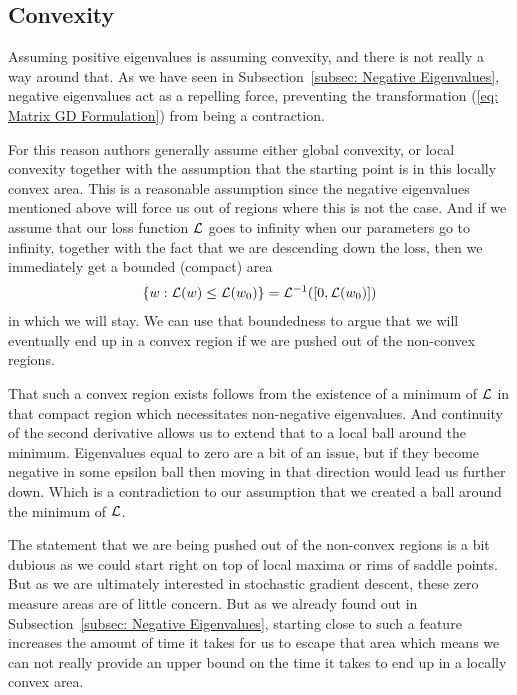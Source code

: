 \subsection{Convexity}

Assuming positive eigenvalues is assuming convexity, and there is not really a
way around that. As we have seen in Subsection~\ref{subsec: Negative
Eigenvalues}, negative eigenvalues act as a repelling force, preventing the
transformation (\ref{eq: Matrix GD Formulation}) from being a contraction.

For this reason authors generally assume either global convexity, or local
convexity together with the assumption that the starting point is in this
locally convex area. This is a reasonable assumption since the negative
eigenvalues mentioned above will force us out of regions where this is not
the case. And if we assume that our loss function \(\mathcal{L}\) goes to infinity when
our parameters go to infinity, together with the fact that we are descending
down the loss, then we immediately get a bounded (compact) area 
%
\begin{align*}
	\{w : \mathcal{L}(w) \le \mathcal{L}(w_0)\} = \mathcal{L}^{-1}([0, \mathcal{L}(w_0)])
\end{align*}
%
in which we will stay. We can use that boundedness to argue that we will
eventually end up in a convex region if we are pushed out of the non-convex
regions.

That such a convex region exists follows from the existence of a minimum of
\(\mathcal{L}\) in that compact region which necessitates non-negative
eigenvalues. And continuity of the second derivative allows us to extend that to 
a local ball around the minimum. Eigenvalues equal to zero
are a bit of an issue, but if they become negative in some epsilon ball
then moving in that direction would lead us further down. Which is a contradiction
to our assumption that we created a ball around the minimum of \(\mathcal{L}\).

The statement that we are being pushed out of the non-convex regions is a bit
dubious as we could start right on top of local maxima or rims of saddle points.
But as we are ultimately interested in stochastic gradient descent, these zero
measure areas are of little concern. But as we already found out in
Subsection~\ref{subsec: Negative Eigenvalues}, starting close to such a feature
increases the amount of time it takes for us to escape that area which means
we can not really provide an upper bound on the time it takes to end up in
a locally convex area.

